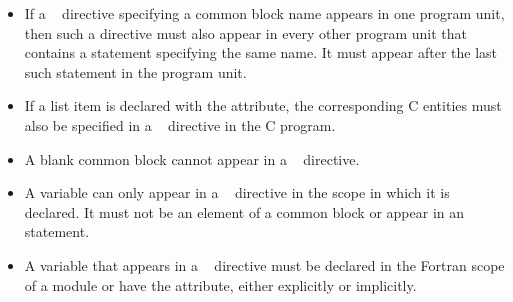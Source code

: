\begin{fortranspecific}
\begin{itemize}
\item If a ~ directive specifying a common
      block name appears in one program unit, then such a directive must
      also appear in every other program unit that contains a 
      statement specifying the same name. It must appear after the last
      such  statement in the program unit.

\item If a list item is declared with the  attribute, the
      corresponding C entities must also be specified in a
      ~ directive in the C program.

\item A blank common block cannot appear in a ~
      directive.

\item A variable can only appear in a ~ directive
      in the scope in which it is declared. It must not be an element of a
      common block or appear in an  statement.

\item A variable that appears in a ~ directive
      must be declared in the Fortran scope of a module or have the
       attribute, either explicitly or implicitly.
\end{itemize}
\end{fortranspecific}
